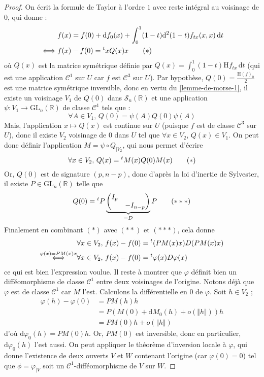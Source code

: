 	\begin{proof}
		On écrit la formule de Taylor à l'ordre $1$ avec reste intégral au voisinage de $0$, qui donne :
		\begin{align*}
			&f(x) = f(0) + \mathrm{d} f_0(x) + \int_0^1 (1-t) \mathrm{d}^2 (1-t) f_{tx} (x, x) \, \mathrm{d}t \\
			\iff& f(x) - f(0) = \mathstrut ^t x Q(x) x \tag{$*$}
		\end{align*}
		où $Q(x)$ est la matrice symétrique définie par $Q(x) = \int_0^1 (1-t) \mathrm{H} f_{tx} \, \mathrm{d}t$ (qui est une application $\mathcal{C}^1$ sur $U$ car $f$ est $\mathcal{C}^3$ sur $U$).
		\newpar
		Par hypothèse, $Q(0) = \frac{\mathrm{H} (f)_0}{2}$ est une matrice symétrique inversible, donc en vertu du \cref{lemme-de-morse-1}, il existe un voisinage $V_1$ de $Q(0)$ dans $\mathcal{S}_n(\mathbb{R})$ et une application $\psi : V_1 \rightarrow \mathrm{GL}_n(\mathbb{R})$ de classe $\mathcal{C}^1$ tels que :
		\[ \forall A \in V_1, \, Q(0) = \psi(A) Q(0) \psi(A) \]
		Mais, l'application $x \mapsto Q(x)$ est continue sur $U$ (puisque $f$ est de classe $\mathcal{C}^3$ sur $U$), donc il existe $V_2$ voisinage de $0$ dans $U$ tel que $\forall x \in V_2$, $Q(x) \in V_1$. On peut donc définir l'application $M = \psi \circ Q_{|V_2}$, qui nous permet d'écrire
		\[ \forall x \in V_2, \, Q(x) = \mathstrut ^t M (x) Q(0) M (x) \tag{$*$} \]
		Or, $Q(0)$ est de signature $(p, n-p)$, donc d'après la loi d'inertie de Sylvester, il existe $P \in \mathrm{GL}_n(\mathbb{R})$ telle que
		\[ Q(0) = \mathstrut ^t P \underbrace{\begin{pmatrix} I_p & \\ & - I_{n-p} \end{pmatrix}}_{= D} P \tag{$***$} \]
		Finalement en combinant $(*)$ avec $(**)$ et $(***)$, cela donne
		\begin{align*}
			&\forall x \in V_2, \, f(x) - f(0) = \mathstrut ^t (P M(x) x) D (P M(x) x) \\
			\overset{\varphi(x) = P M(x) x}{\iff}& \forall x \in V_2, \, f(x) - f(0) = \mathstrut ^t \varphi(x) D \varphi(x)
		\end{align*}
		ce qui est bien l'expression voulue.
		\newpar
		Il reste à montrer que $\varphi$ définit bien un difféomorphisme de classe $\mathcal{C}^1$ entre deux voisinages de l'origine. Notons déjà que $\varphi$ est de classe $\mathcal{C}^1$ car $M$ l'est. Calculons la différentielle en $0$ de $\varphi$. Soit $h \in V_2$ ;
		\begin{align*}
			\varphi(h) - \varphi(0) &= P M(h) h \\
			&= P( M(0) + \mathrm{d} M_0 (h) + o(\Vert h \Vert))h \\
			&= P M(0) h + o(\Vert h \Vert)
		\end{align*}
		d'où $\mathrm{d} \varphi_0 (h) = P M(0) h$. Or, $P M(0)$ est inversible, donc en particulier, $\mathrm{d} \varphi_0 (h)$ l'est aussi. On peut appliquer le théorème d'inversion locale à $\varphi$, qui donne l'existence de deux ouverts $V$ et $W$ contenant l'origine (car $\varphi(0) = 0$) tel que $\phi = \varphi_{|V}$ soit un $\mathcal{C}^1$-difféomorphisme de $V$ sur $W$.
	\end{proof}

